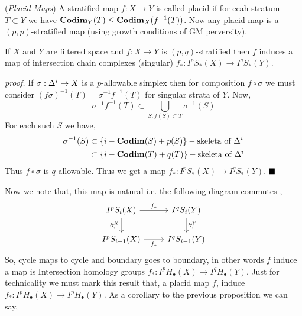 \documentclass[11pt]{article}
\begin{document}
\vspace*{0.2cm}

\noindent {} (\textit{Placid Maps}) A stratified map $f : X \to Y$ is called placid if for ecah stratum $T\subset Y$ we have $\mathbf{Codim}_Y(T) \leq\mathbf{Codim}_X(f^{-1}(T))$. Now any placid map is a $(p,p)$-stratified map (using growth conditions of GM perversity).

\vspace*{0.2cm}

 If $X$ and $Y$ are filtered space and $f : X \to Y$ is $(p,q)$-stratified then $f$ induces a map of intersection chain complexes (singular) $f_{\ast} : I^pS_{\ast}(X) \to I^qS_{\ast}(Y)$. 

\vspace*{0.2cm}

\noindent \textit{proof.} If $\sigma : \Delta^i \to X$ is a $p$-allowable simplex then for composition $f \circ \sigma$ we must consider $(f\sigma)^{-1}(T) = \sigma^{-1}f^{-1}(T)$ for singular strata of $Y$. Now, \[\sigma^{-1}f^{-1}(T) \subset \bigcup_{S : f(S)\subset T}\sigma^{-1}(S)\] For each such $S$ we have, \begin{align*}
    \sigma^{-1}(S) & \subset \qty{i - \mathbf{Codim}(S) + p(S)}-\text{skeleta of } \Delta^i \\
    & \subset \qty{i - \mathbf{Codim}(T) + q(T)}-\text{skeleta of } \Delta^i
\end{align*} Thus $f\circ \sigma$ is $q$-allowable. Thus we get a map $f_{\ast}: I^pS_{\ast}(X) \to I^qS_{\ast}(Y)$. $\hfill \blacksquare$

\vspace*{0.2cm}

\noindent Now we note that, this map is natural i.e. the following diagram commutes , \[\begin{tikzcd}
    {I^pS_i(X)} & {I^qS_i(Y)} \\
    {I^pS_{i-1}(X)} & {I^qS_{i-1}(Y)}
    \arrow["{\p_i^X}"', from=1-1, to=2-1]
    \arrow["{\p_i^Y}", from=1-2, to=2-2]
    \arrow["{f_{\ast}}", from=1-1, to=1-2]
    \arrow["{f_{\ast}}"', from=2-1, to=2-2]
    \end{tikzcd}\] So, cycle maps to cycle and boundary goes to boundary, in other words $f$ induce a map is Intersection homology groups $f_{\ast}: I^pH_{\bullet}(X) \to I^qH_{\bullet}(Y)$. Just for technicality we must mark this result that, a placid  map $f$, induce $f_{\ast}:I^pH_{\bullet}(X) \to I^pH_{\bullet}(Y)$. As a corollary to the previous proposition we can say, 

\end{document}
